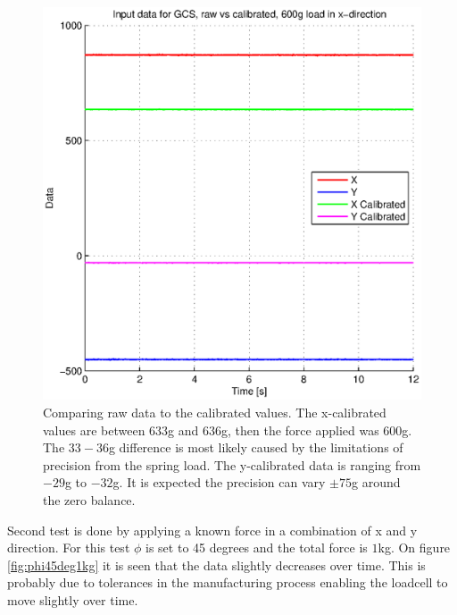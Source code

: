\begin{figure}[H]
\centering
\includegraphics[scale=1]{graphics/gcs_test/calib_result_compare.eps}
\caption{Comparing raw data to the calibrated values. The x-calibrated values are between $633$g and $636$g, then the force applied was $600$g. The $33-36$g difference is most likely caused by the limitations of precision from the spring load. The y-calibrated data is ranging from $-29$g to $-32$g. It is expected the precision can vary $\pm75$g around the zero balance.}
\end{figure}

\noindent
Second test is done by applying a known force in a combination of x and y direction. For this test $\phi$ is set to 45 degrees and the total force is $1$kg. On figure \ref{fig:phi45deg1kg} it is seen that the data slightly decreases over time. This is probably due to tolerances in the manufacturing process enabling the loadcell to move slightly over time.

